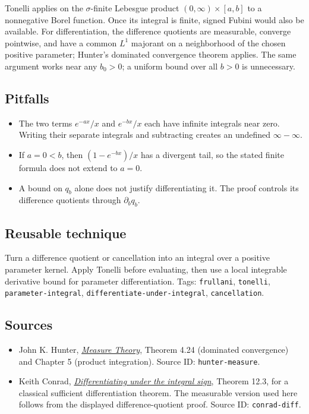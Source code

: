 \documentclass[
  11pt,
]{article}
\providecommand{\tightlist}{%
  \setlength{\itemsep}{0pt}\setlength{\parskip}{0pt}}
\begin{document}
Tonelli applies on the \(\sigma\)-finite Lebesgue product
\((0,\infty)\times[a,b]\) to a nonnegative Borel function. Once its
integral is finite, signed Fubini would also be available. For
differentiation, the difference quotients are measurable, converge
pointwise, and have a common \(L^1\) majorant on a neighborhood of the
chosen positive parameter; Hunter's dominated convergence theorem
applies. The same argument works near any \(b_0>0\); a uniform bound
over all \(b>0\) is unnecessary.

\subsection{Pitfalls}\label{pitfalls-5}

\begin{itemize}
\tightlist
\item
  The two terms \(e^{-ax}/x\) and \(e^{-bx}/x\) each have infinite
  integrals near zero. Writing their separate integrals and subtracting
  creates an undefined \(\infty-\infty\).
\item
  If \(a=0<b\), then \((1-e^{-bx})/x\) has a divergent tail, so the
  stated finite formula does not extend to \(a=0\).
\item
  A bound on \(q_b\) alone does not justify differentiating it. The
  proof controls its difference quotients through \(\partial_b q_b\).
\end{itemize}

\subsection{Reusable technique}\label{reusable-technique-5}

Turn a difference quotient or cancellation into an integral over a
positive parameter kernel. Apply Tonelli before evaluating, then use a
local integrable derivative bound for parameter differentiation. Tags:
\texttt{frullani}, \texttt{tonelli}, \texttt{parameter-\allowbreak{}integral},
\texttt{differentiate-\allowbreak{}under-\allowbreak{}integral}, \texttt{cancellation}.

\subsection{Sources}\label{sources-5}

\begin{itemize}
\tightlist
\item
  John K. Hunter,
  \href{https://www.math.ucdavis.edu/~hunter/measure_theory/measure_notes.pdf}{\emph{Measure
  Theory}}, Theorem 4.24 (dominated convergence) and Chapter 5 (product
  integration). Source ID: \texttt{hunter-\allowbreak{}measure}.
\item
  Keith Conrad,
  \href{https://kconrad.math.uconn.edu/blurbs/analysis/diffunderint.pdf}{\emph{Differentiating
  under the integral sign}}, Theorem 12.3, for a classical sufficient
  differentiation theorem. The measurable version used here follows from
  the displayed difference-quotient proof. Source ID:
  \texttt{conrad-\allowbreak{}diff}.
\end{itemize}
\end{document}
